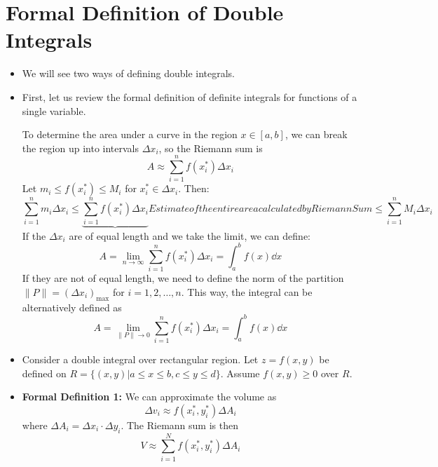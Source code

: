 \section{Formal Definition of Double Integrals}
\begin{itemize}
    \item We will see two ways of defining double integrals.
    \item First, let us review the formal definition of definite integrals for functions of a single variable.
    
    To determine the area under a curve in the region $x\in [a,b]$, we can break the region up into intervals $\Delta x_i$, so the Riemann sum is
    \begin{equation}
        A \approx \sum_{i=1}^n f(x_i^*)\Delta x_i
    \end{equation}
    Let $m_i \le f(x_i^*) \le M_i$ for $x_i^* \in \Delta x_i$. Then: 
    \begin{equation}
        \sum_{i=1}^n m_i \Delta x_i \le \underbrace{\sum_{i=1}^n f(x_i^*)\Delta x_i}{Estimate of the entire area calculated by Riemann Sum} \le \sum_{i=1}^n M_i \Delta x_i
    \end{equation}
    If the $\Delta x_i$ are of equal length and we take the limit, we can define: 
    \begin{equation}
        A = \lim_{n\to\infty} \sum_{i=1}^n f(x_i^*)\Delta x_i = \int_a^b f(x) \dd{x}
    \end{equation}
    If they are not of equal length, we need to define the norm of the partition $\lVert P \rVert = (\Delta x_i)_\text{max}$ for $i=1,2,\dots,n$. This way, the integral can be alternatively defined as 
    \begin{equation}
        A = \lim_{\lVert P \rVert \rightarrow 0} \sum_{i=1}^n f(x_i^*)\Delta x_i = \int_a^b f(x) \dd{x}
    \end{equation}
    \item Consider a double integral over rectangular region. Let $z=f(x,y)$ be defined on $R=\{(x,y)|a\le x\le b, c\le y \le d\}$. Assume $f(x,y) \ge 0$ over $R$.
    \item \textbf{Formal Definition 1:} We can approximate the volume as
    \begin{equation}
        \Delta v_i \approx f(x_i^*,y_i^*)\Delta A_i
    \end{equation}
    where $\Delta A_i = \Delta x_i \cdot \Delta y_i$. The Riemann sum is then 
    \begin{equation}
        V \approx \sum_{i=1}^N f(x_i^*,y_i^*)\Delta A_i

\end{equation}
\end{itemize}
